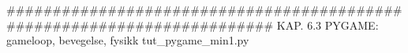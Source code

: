 ######################################################################## 
KAP. 6.3  PYGAME: gameloop, bevegelse, fysikk
tut_pygame_min1.py


